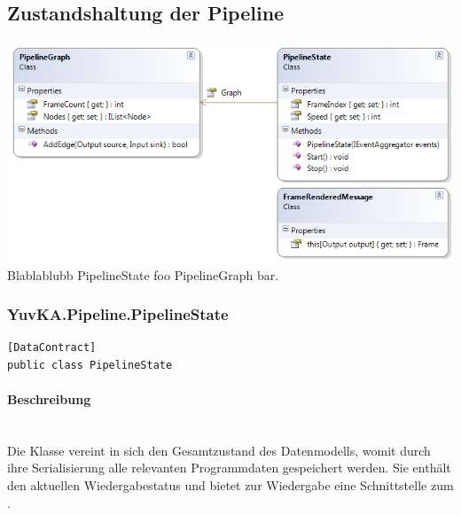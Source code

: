 \subsection{Zustandshaltung der Pipeline}

\includegraphics[width=\textwidth]{YuvKA.Pipeline/states.png}
Blablablubb PipelineState foo PipelineGraph bar.

\subsubsection{YuvKA.Pipeline.PipelineState}

\begin{verbatim}
[DataContract]
public class PipelineState
\end{verbatim}

\paragraph{Beschreibung}~\\
Die Klasse  vereint in sich den Gesamtzustand des Datenmodells, womit durch ihre Serialisierung alle relevanten Programmdaten gespeichert werden. Sie enthält den aktuellen Wiedergabestatus und bietet zur Wiedergabe eine Schnittstelle zum .

